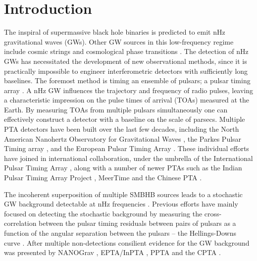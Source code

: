 \documentclass[fleqn,usenatbib,useAMS]{mnras}
\begin{document}
\section{Introduction}\label{sec:intro}
The inspiral of supermassive black hole binaries \citep[SMBHBs;][]{Rajagopal1995,Jaffe_2003, Wyithe2003,Sesana2013,McWilliams_2014,Ravi2015MNRAS.447.2772R,Burke2019, Skyes2022} is predicted to emit nHz gravitational waves (GWs). Other GW sources in this low-frequency regime include cosmic strings \citep[e.g.][]{PTAstring} and cosmological phase transitions \citep[e.g.][]{PTAphase}. The detection of nHz GWs has necessitated the development of new observational methods, since it is practically impossible to engineer interferometric detectors with sufficiently long baselines. The foremost method is timing an ensemble of pulsars; a pulsar timing array \citep[PTA;][]{ Tiburzi2018, 2021hgwa.bookE...4V}. A nHz GW influences the trajectory and frequency of radio pulses, leaving a characteristic impression on the pulse times of arrival (TOAs) measured at the  Earth. By measuring TOAs from multiple pulsars simultaneously one can effectively construct a detector with a baseline on the scale of parsecs. Multiple PTA detectors have been built over the last few decades, including the North American Nanohertz Observatory for Gravitational Waves \citep[NANOGrav,][]{NANOgrav2023}, the Parkes Pulsar Timing array \citep[PPTA,][]{Parkes2023}, and the European Pulsar Timing Array \citep[EPTA,][]{EPTA2023}. These individual efforts have joined in international collaboration, under the umbrella of the International Pulsar Timing Array \citep[IPTA,][]{2019MNRAS.490.4666P}, along with a number of newer PTAs such as the Indian Pulsar Timing Array Project \citep[InPTA,][]{ipta}, MeerTime \citep{meertime2,Meertime} and the Chinese PTA \citep[CPTA,][]{Hobbs_2019}. \newline 

The incoherent superposition of multiple SMBHB sources leads to a stochastic GW background detectable at nHz frequencies \citep{Allen1997,Sesana10,Christensen2019,Renzini2022}. Previous efforts have mainly focused on detecting the stochastic background by measuring the cross-correlation between the pulsar timing residuals between pairs of pulsars as a function of the angular separation between the pulsars -- the Hellings-Downs curve \citep{Hellings}. After multiple non-detections \citep{Lentati2015,NanoGrav2018,2022MNRAS.510.4873A} consilient evidence for the GW background was presented by NANOGrav \citep{2023ApJ...951L...8A}, EPTA/InPTA \citep{2023arXiv230616214A}, PPTA \citep{2023ApJ...951L...6R} and the CPTA \citep{2023RAA....23g5024X}. \newline 
\end{document}
